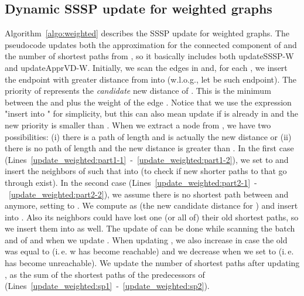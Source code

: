 \documentclass[english]{llncs}
\newcommand{\ie}{i.\,e.\xspace}
\newcommand{\vd}{\xspace}
\newcommand{\upvd}{\textsf{updateApprVD-W}\xspace}
\newcommand{\sssp}{\textsf{updateSSSP-W}\xspace}
\begin{document}
\subsection{Dynamic SSSP update for weighted graphs}
Algorithm~\ref{algo:weighted} describes the SSSP update for weighted graphs. The pseudocode updates both the \vd approximation for the connected component of  and the number of shortest paths from , so it basically includes both \sssp and \upvd.
Initially, we scan the edges  in  and, for each , we insert the endpoint with greater distance from  into  (w.l.o.g., let  be such endpoint). The priority  of  represents the \textit{candidate} new distance of . This is the minimum between the  and  plus the weight of the edge . Notice that we use the expression "insert  into " for simplicity, but this can also mean update  if  is already in  and the new priority is smaller than . 
When we extract a node  from , we have two possibilities: (i) there is a path of length  and  is actually the new distance or (ii) there is no path of length  and the new distance is greater than . In the first case (Lines~\ref{update_weighted:part1-1}~-~\ref{update_weighted:part1-2}), we set  to  and insert the neighbors  of  such that  into  (to check if new shorter paths to  that go through  exist). In the second case (Lines~\ref{update_weighted:part2-1}~-~\ref{update_weighted:part2-2}), we assume there is no shortest path between  and  anymore, setting  to . We compute  as  (the new candidate distance for ) and insert  into . Also its neighbors could have lost one (or all of) their old shortest paths, so we insert them into  as well. The update of  can be done while scanning the batch and of  and  when we update . When updating , we also increase  in case the old  was equal to  (\ie w has become reachable) and we decrease  when we set  to  (\ie  has become unreachable). We update the number of shortest paths after updating , as the sum of the shortest paths of the predecessors of  (Lines~\ref{update_weighted:sp1}~-~\ref{update_weighted:sp2}).
\end{document}
